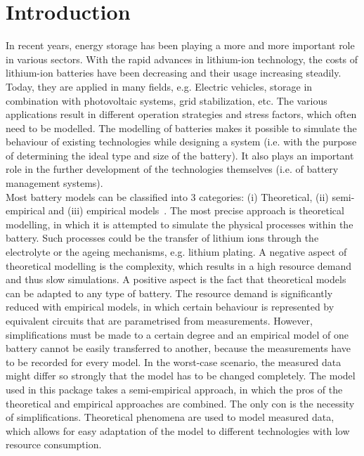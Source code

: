 \section{Introduction}
In recent years, energy storage has been playing a more and more important role in various sectors. With the rapid advances in lithium-ion technology, the costs of lithium-ion batteries have been decreasing and their usage increasing steadily. Today, they are applied in many fields, e.g. Electric vehicles, storage in combination with photovoltaic systems, grid stabilization, etc. The various applications result in different operation strategies and stress factors, which often need to be modelled. The modelling of batteries makes it possible to simulate the behaviour of existing technologies while designing a system (i.e. with the purpose of determining the ideal type and size of the battery). It also plays an important role in the further development of the technologies themselves (i.e. of battery management systems). \\
Most battery models can be classified into 3 categories: (i) Theoretical, (ii) semi-empirical and (iii) empirical models~\cite{cui_multi-stress_2015, xu_degradation-limiting_2013}. The most precise approach is theoretical modelling, in which it is attempted to simulate the physical processes within the battery. Such processes could be the transfer of lithium ions through the electrolyte or the ageing mechanisms, e.g. lithium plating. A negative aspect of theoretical modelling is the complexity, which results in a high resource demand and thus slow simulations. A positive aspect is the fact that theoretical models can be adapted to any type of battery. The resource demand is significantly reduced with empirical models, in which certain behaviour is represented by equivalent circuits that are parametrised from measurements. However, simplifications must be made to a certain degree and an empirical model of one battery cannot be easily transferred to another, because the measurements have to be recorded for every model. In the worst-case scenario, the measured data might differ so strongly that the model has to be changed completely. The model used in this package takes a semi-empirical approach, in which the pros of the theoretical and empirical approaches are combined. The only con is the necessity of simplifications. Theoretical phenomena are used to model measured data, which allows for easy adaptation of the model to different technologies with low resource consumption. \\
